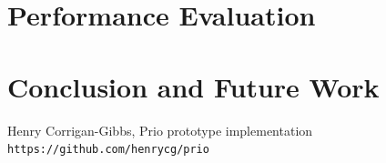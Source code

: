 \documentclass{article}
\begin{document}
\section{Performance Evaluation}
\section{Conclusion and Future Work}
\begin{thebibliography}{9}
Henry Corrigan-Gibbs, Prio prototype implementation\\
\texttt{https://github.com/henrycg/prio}
\end{thebibliography}
\end{document}
